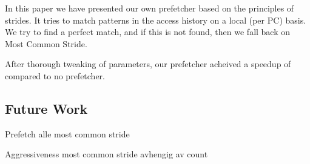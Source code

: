 In this paper we have presented our own prefetcher based on the principles of strides. It tries to match patterns in the access history on a local (per PC) basis. We try to find a perfect match, and if this is not found, then we fall back on Most Common Stride.

After thorough tweaking of parameters, our prefetcher acheived a speedup of \speedup compared to no prefetcher. 

\subsection{Future Work}

Prefetch alle most common stride

Aggressiveness most common stride avhengig av count

